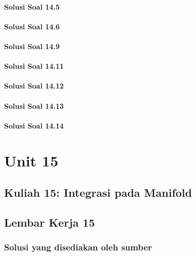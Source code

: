 \documentclass[11pt,a4paper,oneside]{book}
\begin{document}
\subsection*{Solusi Soal 14.5}

\subsection*{Solusi Soal 14.6}

\subsection*{Solusi Soal 14.9}

\subsection*{Solusi Soal 14.11}

\subsection*{Solusi Soal 14.12}

\subsection*{Solusi Soal 14.13}

\subsection*{Solusi Soal 14.14}


\part{Unit 15}
\chapter[Kuliah 15]{Kuliah 15: Integrasi pada Manifold}


\chapter{Lembar Kerja 15}


\section*{Solusi yang disediakan oleh sumber}
\end{document}
